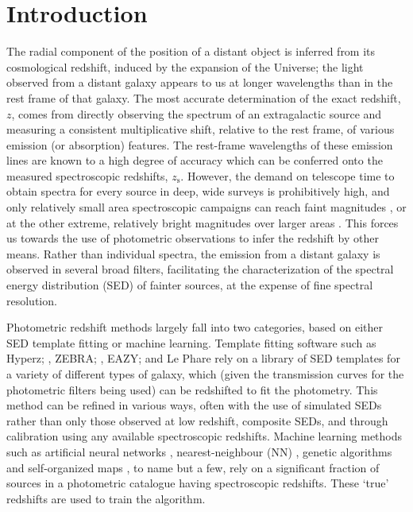 \documentclass[useAMS,usenatbib,fleqn]{mn2e}
\begin{document}
\section{Introduction}
The radial component of the position of a distant object is inferred from its cosmological redshift, induced by the expansion of the Universe; the light observed from a distant galaxy appears to us at longer wavelengths than in the rest frame of that galaxy. The most accurate determination of the exact redshift, $z$, comes from directly observing the spectrum of an extragalactic source and measuring a consistent multiplicative shift, relative to the rest frame, of various emission (or absorption) features. The rest-frame wavelengths of these emission lines are known to a high degree of accuracy which can be conferred onto the measured spectroscopic redshifts, $z_\textrm{s}$. However, the demand on telescope time to obtain spectra for every source in deep, wide surveys is prohibitively high, and only relatively small area spectroscopic campaigns can reach faint magnitudes \citep[e.g.][]{Lilly2009,LeFevre2013,LeFevre2015}, or at the other extreme, relatively bright magnitudes over larger areas \citep[e.g.][]{2dfgrs,GAMA,SDSS3}.
This forces us towards the use of photometric observations to infer the redshift by other means. Rather than individual spectra, the emission from a distant galaxy is observed in several broad filters, facilitating the characterization of the spectral energy distribution (SED) of fainter sources, at the expense of fine spectral resolution.

Photometric redshift methods largely fall into two categories, based on either SED template fitting or machine learning. Template fitting software such as {\sc Hyperz}; \citep[][]{Hyperz}, {\sc ZEBRA}; \citep{ZEBRA}, {\sc EAZY}; \citep[][]{EAZY} and {\sc Le Phare} \citep[][]{Ilbert2006} rely on a library of SED templates for a variety of different types of galaxy, which (given the transmission curves for the photometric filters being used) can be redshifted to fit the photometry. This method can be refined in various ways, often with the use of simulated SEDs rather than only those observed at low redshift, composite SEDs, and through calibration using any available spectroscopic redshifts. Machine learning methods such as artificial neural networks \citep[e.g. {\sc ANNz};][]{Firth2003,Collister04}, nearest-neighbour (NN) \citep{Ball2008}, genetic algorithms \citep[e.g.][]{Hogan2015} and self-organized maps \citep[][]{Geach2012}, to name but a few, rely on a significant fraction of sources in a photometric catalogue having spectroscopic redshifts. These `true' redshifts are used to train the algorithm. 
\end{document}

